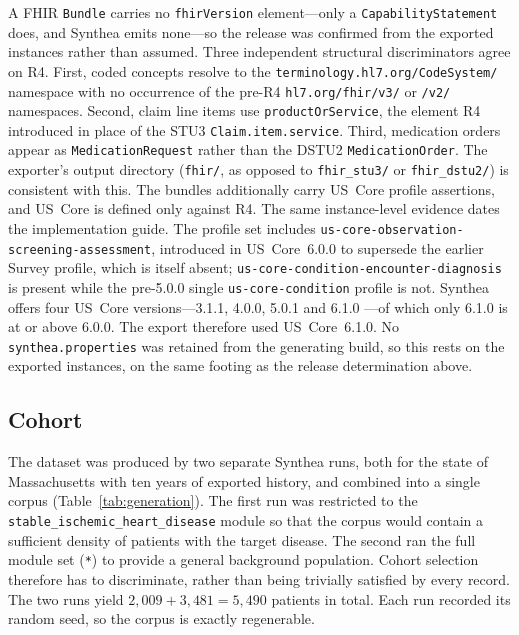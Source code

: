 A FHIR \texttt{Bundle} carries no \texttt{fhirVersion} element---only a
\texttt{CapabilityStatement} does, and Synthea emits none---so the release was confirmed
from the exported instances rather than assumed. Three independent structural
discriminators agree on R4. First, coded concepts resolve to the
\texttt{terminology.hl7.org/CodeSystem/} namespace with no occurrence of the pre-R4
\texttt{hl7.org/fhir/v3/} or \texttt{/v2/} namespaces. Second, claim line items use
\texttt{productOrService}, the element R4 introduced in place of the STU3
\texttt{Claim.item.service}. Third, medication orders appear as
\texttt{MedicationRequest} rather than the DSTU2 \texttt{MedicationOrder}. The exporter's
output directory (\texttt{fhir/}, as opposed to \texttt{fhir\_stu3/} or
\texttt{fhir\_dstu2/}) is consistent with this. The bundles additionally carry US~Core
profile assertions, and US~Core is defined only against R4.
The same instance-level evidence dates the implementation guide. The profile set includes
\texttt{us-core-observation-screening-assessment}, introduced in US~Core~6.0.0 to supersede
the earlier Survey profile, which is itself absent; \texttt{us-core-condition-encounter-diagnosis}
is present while the pre-5.0.0 single \texttt{us-core-condition} profile is not. Synthea
offers four US~Core versions---3.1.1, 4.0.0, 5.0.1 and 6.1.0 \cite{synthea_fhir_wiki}---of
which only 6.1.0 is at or above 6.0.0. The export therefore used US~Core~6.1.0. No
\texttt{synthea.properties} was retained from the generating build, so this rests on the
exported instances, on the same footing as the release determination above.

\subsection{Cohort}
\label{sec:cohort}
The dataset was produced by two separate Synthea runs, both for the state of Massachusetts
with ten years of exported history, and combined into a single corpus
(Table~\ref{tab:generation}). The first run was restricted to the \texttt{stable\_ischemic\_heart\_disease} module so that
the corpus would contain a sufficient density of patients with the target disease. The
second ran the full module set (\texttt{*}) to provide a general background population.
Cohort selection therefore has to discriminate, rather than being trivially satisfied by
every record. The two runs yield
$2{,}009 + 3{,}481 = 5{,}490$ patients in total. Each run recorded its random seed, so the
corpus is exactly regenerable.

